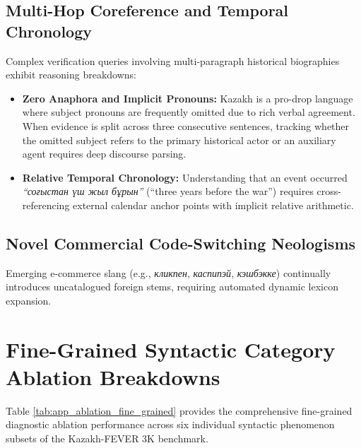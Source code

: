 \subsection{Multi-Hop Coreference and Temporal Chronology}
Complex verification queries involving multi-paragraph historical biographies exhibit reasoning breakdowns:
\begin{itemize}
    \item \textbf{Zero Anaphora and Implicit Pronouns:} Kazakh is a pro-drop language where subject pronouns are frequently omitted due to rich verbal agreement. When evidence is split across three consecutive sentences, tracking whether the omitted subject refers to the primary historical actor or an auxiliary agent requires deep discourse parsing.
    \item \textbf{Relative Temporal Chronology:} Understanding that an event occurred \textit{``соғыстан үш жыл бұрын''} (``three years before the war'') requires cross-referencing external calendar anchor points with implicit relative arithmetic.
\end{itemize}

\subsection{Novel Commercial Code-Switching Neologisms}
Emerging e-commerce slang (e.g., \textit{кликпен}, \textit{каспипэй}, \textit{кэшбэкке}) continually introduces uncatalogued foreign stems, requiring automated dynamic lexicon expansion.

\clearpage

\section{Fine-Grained Syntactic Category Ablation Breakdowns}
\label{sec:app_error_fine_grained_ablation}

Table \ref{tab:app_ablation_fine_grained} provides the comprehensive fine-grained diagnostic ablation performance across six individual syntactic phenomenon subsets of the Kazakh-FEVER 3K benchmark.


